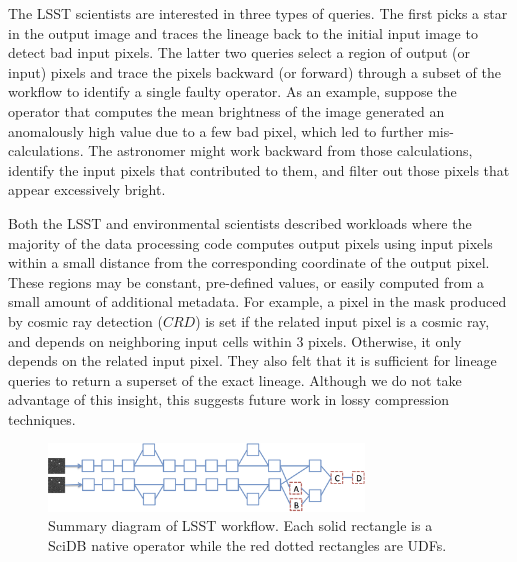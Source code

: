 The LSST scientists are interested in three types of queries.  The first picks
a star in the output image and traces the lineage back to the initial
input image to detect bad input pixels.  The latter two queries select a
region of output (or input) pixels and trace the pixels backward (or forward)
through a subset of the workflow to identify a single faulty operator.  
As an example, suppose the operator that computes the mean brightness of the
image  generated an anomalously high value due to a few bad pixel, which led to
further mis-calculations.  The astronomer might work backward from those
calculations, identify the input pixels that contributed to them, and filter out
those pixels that appear excessively bright.

Both the LSST and environmental scientists described workloads where the majority
of the data processing code computes output pixels using input pixels within a
small distance from the corresponding coordinate of the output pixel.  These
regions may be constant, pre-defined values, or easily computed from a small
amount of additional metadata.  For example, a pixel in the mask produced by
cosmic ray detection ($CRD$) is set if the related input pixel is a cosmic ray,
and depends on neighboring input cells within 3 pixels.  Otherwise, it only
depends on the related input pixel.  They also felt that it is sufficient for lineage queries
to return a superset of the exact lineage.  Although we do not take
advantage of this insight, this suggests future work in lossy compression
techniques.




\begin{figure}[h] \centerline{\includegraphics[width=3.3in,natwidth=8.49in,natheight=1.84in]{figures/lsst.png}}
\caption{Summary diagram of LSST workflow.  Each solid rectangle is a SciDB
native operator while the red dotted rectangles are UDFs.}
\label{f:lsstworkflow} \end{figure}
 













